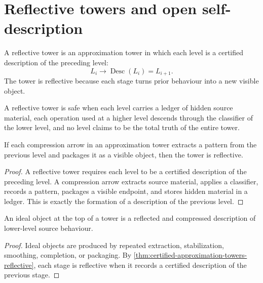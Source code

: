 \section{Reflective towers and open self-description}
\label{sec:reflective-towers-open-self-description}

\begin{definition}
\label{def:reflective-tower}
A reflective tower is an approximation tower in which each level is a certified description of the preceding level:
$$
L_i
\to
\operatorname{Desc}(L_i)
=
L_{i+1}.
$$
The tower is reflective because each stage turns prior behaviour into a new visible object.
\end{definition}

\begin{definition}
\label{def:safe-reflection}
A reflective tower is safe when each level carries a ledger of hidden source material, each operation used at a higher level descends through the classifier of the lower level, and no level claims to be the total truth of the entire tower.
\end{definition}

\begin{theorem}
\label{thm:certified-approximation-towers-reflective}
If each compression arrow in an approximation tower extracts a pattern from the previous level and packages it as a visible object, then the tower is reflective.
\end{theorem}

\begin{proof}
A reflective tower requires each level to be a certified description of the preceding level. A compression arrow extracts source material, applies a classifier, records a pattern, packages a visible endpoint, and stores hidden material in a ledger. This is exactly the formation of a description of the previous level.
\end{proof}

\begin{corollary}
\label{cor:idealization-reflection-under-compression}
An ideal object at the top of a tower is a reflected and compressed description of lower-level source behaviour.
\end{corollary}

\begin{proof}
Ideal objects are produced by repeated extraction, stabilization, smoothing, completion, or packaging. By \autoref{thm:certified-approximation-towers-reflective}, each stage is reflective when it records a certified description of the previous stage.
\end{proof}

